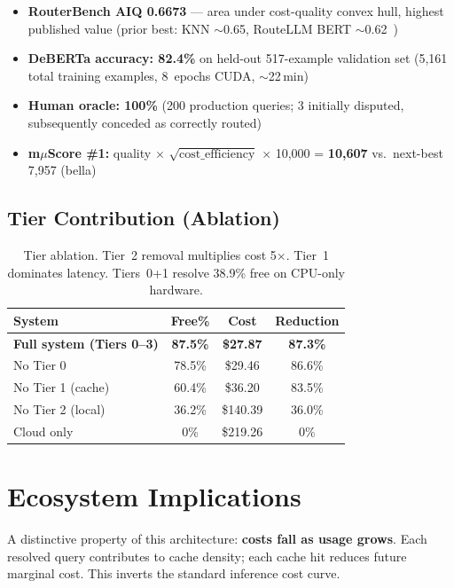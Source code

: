 \documentclass[11pt]{article}
\begin{document}
\begin{itemize}
  \item \textbf{RouterBench AIQ 0.6673} --- area under cost-quality
    convex hull, highest published value (prior best: KNN $\sim$0.65,
    RouteLLM BERT $\sim$0.62~\cite{ong2024routellm})
  \item \textbf{DeBERTa accuracy: 82.4\%} on held-out 517-example
    validation set (5,161 total training examples, 8~epochs CUDA,
    $\sim$22\,min)
  \item \textbf{Human oracle: 100\%} (200 production queries; 3
    initially disputed, subsequently conceded as correctly routed)
  \item \textbf{m$\mu$Score \#1:} quality $\times$
    $\sqrt{\text{cost\_efficiency}}$ $\times$ 10,000 = \textbf{10,607}
    vs.\ next-best 7,957 (bella)
\end{itemize}

\subsection{Tier Contribution (Ablation)}

\begin{table}[t]
\centering
\small
\begin{tabular}{lccc}
\toprule
\textbf{System} & \textbf{Free\%} & \textbf{Cost} & \textbf{Reduction} \\
\midrule
\textbf{Full system (Tiers 0--3)} & \textbf{87.5\%} & \textbf{\$27.87} & \textbf{87.3\%} \\
No Tier 0 & 78.5\% & \$29.46 & 86.6\% \\
No Tier 1 (cache) & 60.4\% & \$36.20 & 83.5\% \\
No Tier 2 (local) & 36.2\% & \$140.39 & 36.0\% \\
Cloud only & 0\% & \$219.26 & 0\% \\
\bottomrule
\end{tabular}
\caption{Tier ablation. Tier~2 removal multiplies cost 5$\times$. Tier~1 dominates latency. Tiers~0+1 resolve 38.9\% free on CPU-only hardware.}
\label{tab:ablation}
\end{table}

\section{Ecosystem Implications}

A distinctive property of this architecture: \textbf{costs fall as
usage grows}. Each resolved query contributes to cache density; each
cache hit reduces future marginal cost. This inverts the standard
inference cost curve.
\end{document}
